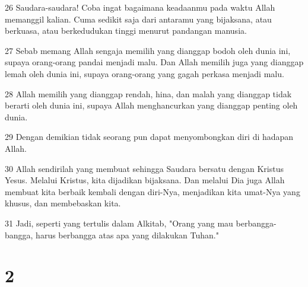 \par 26 Saudara-saudara! Coba ingat bagaimana keadaanmu pada waktu Allah memanggil kalian. Cuma sedikit saja dari antaramu yang bijaksana, atau berkuasa, atau berkedudukan tinggi menurut pandangan manusia.
\par 27 Sebab memang Allah sengaja memilih yang dianggap bodoh oleh dunia ini, supaya orang-orang pandai menjadi malu. Dan Allah memilih juga yang dianggap lemah oleh dunia ini, supaya orang-orang yang gagah perkasa menjadi malu.
\par 28 Allah memilih yang dianggap rendah, hina, dan malah yang dianggap tidak berarti oleh dunia ini, supaya Allah menghancurkan yang dianggap penting oleh dunia.
\par 29 Dengan demikian tidak seorang pun dapat menyombongkan diri di hadapan Allah.
\par 30 Allah sendirilah yang membuat sehingga Saudara bersatu dengan Kristus Yesus. Melalui Kristus, kita dijadikan bijaksana. Dan melalui Dia juga Allah membuat kita berbaik kembali dengan diri-Nya, menjadikan kita umat-Nya yang khusus, dan membebaskan kita.
\par 31 Jadi, seperti yang tertulis dalam Alkitab, "Orang yang mau berbangga-bangga, harus berbangga atas apa yang dilakukan Tuhan."

\chapter{2}

